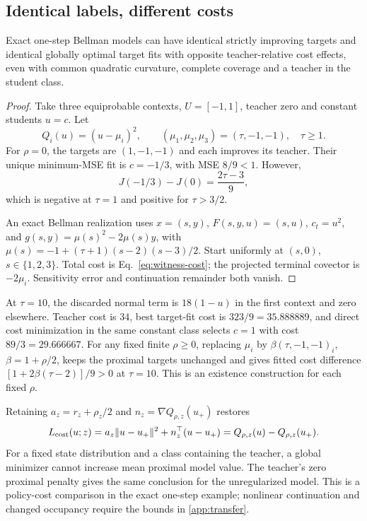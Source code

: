 \subsection{Identical labels, different costs}\label{sec:information-loss}
\begin{proposition}\label{prop:label-loss}
Exact one-step Bellman models can have identical strictly improving
targets and identical globally optimal target fits with opposite
teacher-relative cost effects, even with common quadratic curvature,
complete coverage and a teacher in the student class.
\end{proposition}
\begin{proof}
Take three equiprobable contexts, $U=[-1,1]$, teacher zero and constant
students $u=c$. Let
\begin{equation}\label{eq:witness-cost}
 Q_i(u)=(u-\mu_i)^2,\qquad (\mu_1,\mu_2,\mu_3)=(\tau,-1,-1),\quad \tau\geq1.
\end{equation}
For $\rho=0$, the targets are $(1,-1,-1)$ and each improves its teacher.
Their unique minimum-MSE fit is $c=-1/3$, with MSE $8/9<1$. However,
\begin{equation}\label{eq:witness-gap}
 J(-1/3)-J(0)=\frac{2\tau-3}{9},
\end{equation}
which is negative at $\tau=1$ and positive for $\tau>3/2$.

An exact Bellman realization uses $x=(s,y)$, $F(s,y,u)=(s,u)$,
$c_t=u^2$, and $g(s,y)=\mu(s)^2-2\mu(s)y$, with
$\mu(s)=-1+(\tau+1)(s-2)(s-3)/2$. Start uniformly at $(s,0)$,
$s\in\{1,2,3\}$. Total cost is Eq.~\eqref{eq:witness-cost}; the
projected terminal covector is $-2\mu_i$. Sensitivity error and
continuation remainder both vanish.
\end{proof}

At $\tau=10$, the discarded normal term is $18(1-u)$ in the first
context and zero elsewhere. Teacher cost is 34, best target-fit cost
is $323/9=35.888889$, and direct cost minimization in the same constant
class selects $c=1$ with cost $89/3=29.666667$.
For any fixed finite $\rho\geq0$, replacing $\mu_i$ by
$\beta(\tau,-1,-1)_i$, $\beta=1+\rho/2$, keeps the proximal targets
unchanged and gives fitted cost difference $[1+2\beta(\tau-2)]/9>0$
at $\tau=10$. This is an existence construction for each fixed $\rho$.

Retaining $a_z=r_z+\rho_z/2$ and $n_z=\nabla Q_{\rho,z}(u_+)$ restores
\begin{equation}\label{eq:cost-preserving-loss}
 L_{\rm cost}(u;z)=a_z\|u-u_+\|^2+n_z^\top(u-u_+)
                 =Q_{\rho,z}(u)-Q_{\rho,z}(u_+).
\end{equation}
For a fixed state distribution and a class containing the teacher, a
global minimizer cannot increase mean proximal model value. The
teacher's zero proximal penalty gives the same conclusion for the
unregularized model. This is a policy-cost comparison in the exact
one-step example; nonlinear continuation and changed occupancy require
the bounds in \ref{app:transfer}.

